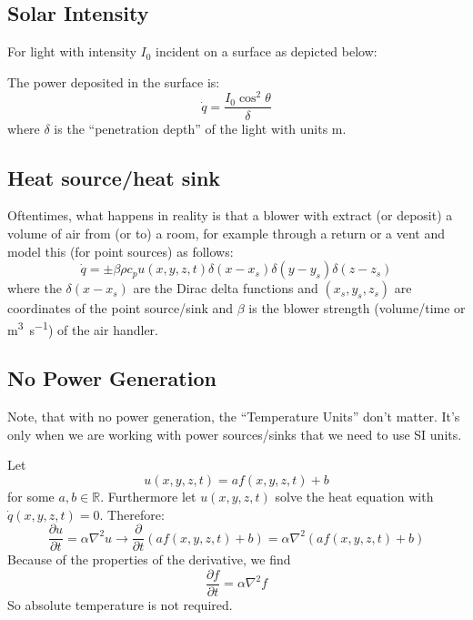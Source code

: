 \documentclass{article}
\begin{document}
\subsection{Solar Intensity}
For light with intensity $I_0$ incident on a surface as depicted below:
\begin{center}
\end{center}

The power deposited in the surface is:
\[
  \dot{q} = \frac{I_0 \cos^2\theta}{\delta}
\]
where $\delta$ is the ``penetration depth'' of the light with units \unit{\meter}.


\subsection{Heat source/heat sink}
Oftentimes, what happens in reality is that a blower with extract (or deposit) a volume of air
from (or to) a room, for example through a return or a vent and model this (for point sources)
as follows:
\[
  \dot{q} = \pm \beta\rho c_p u(x,y,z,t) \delta(x-x_s)\delta(y-y_s)\delta(z-z_s)
\]
where the $\delta(x-x_s)$ are the Dirac delta functions and $(x_s,y_s,z_s)$ are coordinates of
the point source/sink and $\beta$ is the blower strength (volume/time or
\unit{\meter^3\per\second}) of the air handler.

\subsection{No Power Generation}
Note, that with no power generation, the ``Temperature Units'' don't matter. It's only when we
are working with power sources/sinks that we need to use SI units.

Let
\[
  u(x,y,z,t) = a f(x,y,z,t) + b
\]
for some $a,b\in\mathbb{R}$. Furthermore let $u(x,y,z,t)$ solve the heat equation with
$\dot{q}(x,y,z,t)=0$. Therefore:
\[
  \frac{\partial u}{\partial t} = \alpha \nabla^2u \rightarrow \frac{\partial}{\partial t}(a
  f(x,y,z,t) + b) = \alpha \nabla^2\left(a f(x,y,z,t) + b\right)
\]
Because of the properties of the derivative, we find
\[
  \frac{\partial f}{\partial t} = \alpha \nabla^2f
\]
So absolute temperature is not required.
\end{document}
